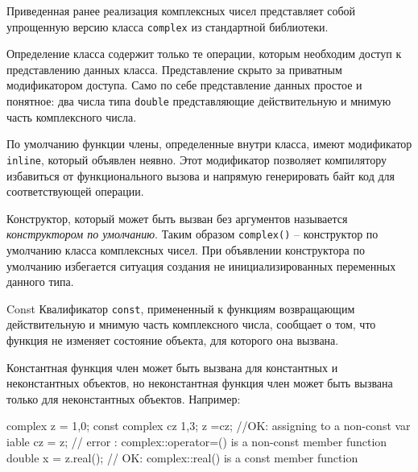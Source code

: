\documentclass[
    9pt,
    hyperref={pdfencoding=unicode}
    ]{beamer}
\theoremstyle{definition}
\begin{document}
\begin{frame}
    Приведенная ранее реализация комплексных чисел представляет собой упрощенную версию класса  \texttt{complex} из стандартной библиотеки.
    
    \vfill
    
    Определение класса содержит только те операции, которым необходим доступ к 
    представлению данных класса. Представление скрыто за приватным модификатором 
    доступа. Само по себе представление данных простое и понятное: два числа типа 
    \texttt{double} представляющие действительную и мнимую часть 
    комплексного числа.
    
    \vfill
    
    По умолчанию функции члены, определенные внутри класса, имеют модификатор 
    \texttt{inline}, который объявлен неявно. Этот модификатор позволяет 
    компилятору избавиться от функционального вызова и напрямую генерировать байт код 
    для соответствующей операции.
    
    \vfill
    
    Конструктор, который может быть вызван без аргументов называется 
    \emph{конструктором по умолчанию}. Таким образом \texttt{complex()} -- 
    конструктор по умолчанию класса комплексных чисел. При объявлении конструктора по 
    умолчанию избегается ситуация создания не инициализированных переменных данного 
    типа.
    
\end{frame}

\begin{frame}[fragile]{Const}
    Квалификатор \texttt{const}, примененный к функциям возвращающим действительную и мнимую часть комплексного числа, сообщает о том, что функция не изменяет состояние объекта, для которого она вызвана.
    
    \vfill
    
    Константная функция член может быть вызвана для константных и неконстантных объектов, но неконстантная функция член может быть вызвана только для неконстантных объектов. Например:
    
    \vfill
    
    \begin{cppcode}
        complex z = {1,0};
        const complex cz {1,3};
        z =cz; //OK: assigning to a non-const var iable
        cz = z; // error : complex::operator=() is a non-const member function
        double x = z.real(); // OK: complex::real() is a const member function
    \end{cppcode}
\end{frame}
\end{document}
